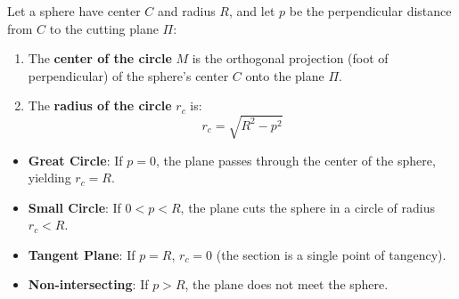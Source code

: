 \begin{center}
\end{center}

\begin{theorembox}
Let a sphere have center $C$ and radius $R$, and let $p$ be the perpendicular distance from $C$ to the cutting plane $\Pi$:
\begin{enumerate}
    \item The \textbf{center of the circle} $M$ is the orthogonal projection (foot of perpendicular) of the sphere's center $C$ onto the plane $\Pi$.
    \item The \textbf{radius of the circle} $r_c$ is:
    \begin{equation}
        \boxed{r_c = \sqrt{R^2 - p^2}}
    \end{equation}
\end{enumerate}
\begin{itemize}[noitemsep]
    \item \textbf{Great Circle}: If $p = 0$, the plane passes through the center of the sphere, yielding $r_c = R$.
    \item \textbf{Small Circle}: If $0 < p < R$, the plane cuts the sphere in a circle of radius $r_c < R$.
    \item \textbf{Tangent Plane}: If $p = R$, $r_c = 0$ (the section is a single point of tangency).
    \item \textbf{Non-intersecting}: If $p > R$, the plane does not meet the sphere.
\end{itemize}
\end{theorembox}

